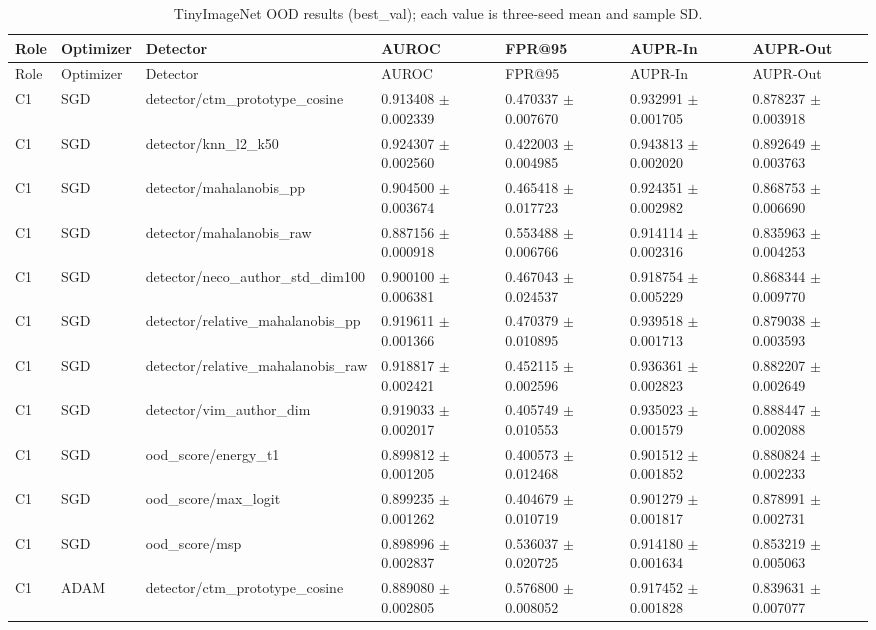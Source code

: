 \begin{longtable}{lllllll}
\caption{TinyImageNet OOD results (best\_val); each value is three-seed mean and sample SD.}\\
Role & Optimizer & Detector & AUROC & FPR@95 & AUPR-In & AUPR-Out \\
\hline
\endfirsthead
Role & Optimizer & Detector & AUROC & FPR@95 & AUPR-In & AUPR-Out \\
\hline
\endhead
C1 & SGD & detector/ctm\_prototype\_cosine & 0.913408 $\pm$ 0.002339 & 0.470337 $\pm$ 0.007670 & 0.932991 $\pm$ 0.001705 & 0.878237 $\pm$ 0.003918 \\
C1 & SGD & detector/knn\_l2\_k50 & 0.924307 $\pm$ 0.002560 & 0.422003 $\pm$ 0.004985 & 0.943813 $\pm$ 0.002020 & 0.892649 $\pm$ 0.003763 \\
C1 & SGD & detector/mahalanobis\_pp & 0.904500 $\pm$ 0.003674 & 0.465418 $\pm$ 0.017723 & 0.924351 $\pm$ 0.002982 & 0.868753 $\pm$ 0.006690 \\
C1 & SGD & detector/mahalanobis\_raw & 0.887156 $\pm$ 0.000918 & 0.553488 $\pm$ 0.006766 & 0.914114 $\pm$ 0.002316 & 0.835963 $\pm$ 0.004253 \\
C1 & SGD & detector/neco\_author\_std\_dim100 & 0.900100 $\pm$ 0.006381 & 0.467043 $\pm$ 0.024537 & 0.918754 $\pm$ 0.005229 & 0.868344 $\pm$ 0.009770 \\
C1 & SGD & detector/relative\_mahalanobis\_pp & 0.919611 $\pm$ 0.001366 & 0.470379 $\pm$ 0.010895 & 0.939518 $\pm$ 0.001713 & 0.879038 $\pm$ 0.003593 \\
C1 & SGD & detector/relative\_mahalanobis\_raw & 0.918817 $\pm$ 0.002421 & 0.452115 $\pm$ 0.002596 & 0.936361 $\pm$ 0.002823 & 0.882207 $\pm$ 0.002649 \\
C1 & SGD & detector/vim\_author\_dim & 0.919033 $\pm$ 0.002017 & 0.405749 $\pm$ 0.010553 & 0.935023 $\pm$ 0.001579 & 0.888447 $\pm$ 0.002088 \\
C1 & SGD & ood\_score/energy\_t1 & 0.899812 $\pm$ 0.001205 & 0.400573 $\pm$ 0.012468 & 0.901512 $\pm$ 0.001852 & 0.880824 $\pm$ 0.002233 \\
C1 & SGD & ood\_score/max\_logit & 0.899235 $\pm$ 0.001262 & 0.404679 $\pm$ 0.010719 & 0.901279 $\pm$ 0.001817 & 0.878991 $\pm$ 0.002731 \\
C1 & SGD & ood\_score/msp & 0.898996 $\pm$ 0.002837 & 0.536037 $\pm$ 0.020725 & 0.914180 $\pm$ 0.001634 & 0.853219 $\pm$ 0.005063 \\
C1 & ADAM & detector/ctm\_prototype\_cosine & 0.889080 $\pm$ 0.002805 & 0.576800 $\pm$ 0.008052 & 0.917452 $\pm$ 0.001828 & 0.839631 $\pm$ 0.007077 \\

\end{longtable}
